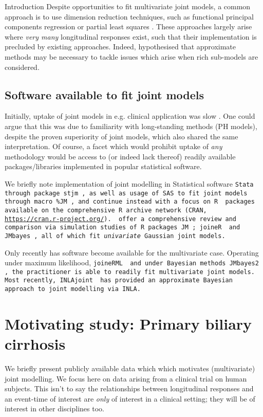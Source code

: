 \begin{chapter}{\label{cha:intro}Introduction}
  Despite opportunities to fit multivariate joint models, a common approach is to use dimension reduction techniques, such as functional principal components regression \citep{Li2017B, Li2021} or partial least squares \citep{Wang2020}. These approaches largely arise where \textit{very many} longitudinal responses exist, such that their implementation is precluded by existing approaches. Indeed, \citet{Hickey2018} hypothesised that approximate methods may be necessary to tackle issues which arise when rich sub-models are considered. 

  \subsection{Software available to fit joint models}\label{sec:intro-evolution-software}
  Initially, uptake of joint models in e.g. clinical application was slow \citep{Gould2015}. One could argue that this was due to familiarity with long-standing methods (\eg PH models), despite the proven superiority of joint models, which also shared the same interpretation. Of course, a facet which would prohibit uptake of \textit{any} methodology would be access to (or indeed lack thereof) readily available packages/libraries implemented in popular statistical software. 
  
  We briefly note implementation of joint modelling in Statistical software \tt{Stata} through package \tt{stjm} \citep{stata-stjm}, as well as usage of \tt{SAS} to fit joint models through macro \tt{\%JM} \citep{SAS-JM}, and continue instead with a focus on \tt{R} \citep{R-R} packages available on the comprehensive R archive network (CRAN, \url{https://cran.r-project.org/}). \citet{Furgal2019} offer a comprehensive review and comparison via simulation studies of \tt{R} packages \tt{JM} \citep{R-JM}; \tt{joineR} \citep{R-joineR} and \tt{JMbayes} \citep{R-JMbayes}, all of which fit \textit{univariate} Gaussian joint models.

  Only recently has software become available for the multivariate case. Operating under maximum likelihood, \tt{joineRML} \citep{Hickey2018} and under Bayesian methods \tt{JMbayes2} \citep{R-JMbayes2}, the practitioner is able to readily fit multivariate joint models. Most recently, \tt{INLAjoint} \citep{Rustand2023} has provided an approximate Bayesian approach to joint modelling via \tt{INLA}.

  \section{\label{sec:intro-motivation-pbc}Motivating study: Primary biliary cirrhosis}
  We briefly present publicly available data which which motivates (multivariate) joint modelling. We focus here on data arising from a clinical trial on human subjects. This isn't to say the relationships between longitudinal responses and an event-time of interest are \textit{only} of interest in a clinical setting; they will be of interest in other disciplines too.
  

\end{chapter}
